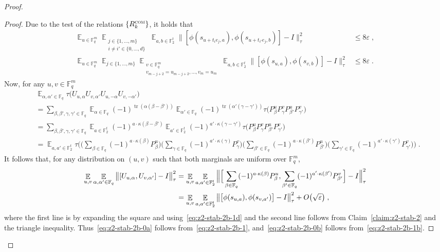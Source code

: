 \documentclass[11pt]{article}
\theoremstyle{definition}
\newcommand{\Id}{\ensuremath{I}}
\DeclareMathOperator*{\Expectation}{\mathbb{E}}
\newcommand{\Es}[1]{\Expectation_{#1}}
\newcommand{\F}{\ensuremath{\mathbb{F}}}
\newcommand{\com}{\textsc{com}}
\newcommand{\eps}{\varepsilon}
\DeclareMathOperator{\tr}{tr}
\begin{document}
\begin{proof}
\begin{proof}
Due to the test of the relations $\{R^\com_k\}$, it holds that 
\begin{align}
\Es{u\in \F_q^m} \Es{\substack{j\in\{1,\ldots,m\} \\ i\neq i' \in \{0,\ldots,d\}}} \Es{a,b\in \F_2^t} \big\| [\phi(s_{u+t_i e_j,a}),\phi(s_{u+t_{i'} e_j,b})] - \Id \big\|_\tau^2&\leq 8\eps\; ,\label{eq:z2-stab-2b-1}\\
\Es{u\in \F_q^m} \Es{j\in\{1,\ldots,m\}} \Es{\substack{v\in \F_q^m \\v_{m-j+2}=u_{m-j+2},\ldots,v_m=u_m}}\Es{a,b\in \F_2^t} \big\| [\phi(s_{u,a}),\phi(s_{v,b})]-\Id\big\|_\tau^2&\leq 8\eps\;.\label{eq:z2-stab-2b-1b}
\end{align}
Now, for any $u,v\in \F_q^m$
\begin{align*}
 &\Es{\alpha,\alpha'\in \F_q}\tau\big( U_{u,\alpha} U_{v,\alpha'} U_{u,-\alpha} U_{v,-\alpha'} \big) \\
&= \sum_{\beta,\beta',\gamma,\gamma'\in \F_q}\Es{\alpha\in \F_q} (-1)^{\tr(\alpha(\beta-\beta'))} \Es{\alpha'\in \F_q} (-1)^{\tr(\alpha'(\gamma-\gamma'))}  \tau(P^{u}_\beta P^{v}_\gamma P^{u}_{\beta'} P^{v}_{\gamma'}\big)\\
&=\sum_{\beta,\beta',\gamma,\gamma'\in \F_q}\Es{a\in\F_2^t} (-1)^{a\cdot\kappa(\beta-\beta')} \Es{a'\in\F_2^t} (-1)^{a'\cdot\kappa(\gamma-\gamma')} \tau(P^{u}_\beta P^{v}_\gamma P^{u}_{\beta'} P^{v}_{\gamma'}\big)\\
&=\Es{a,a'\in\F_2^t}  \tau\Big( \Big(\sum_{\beta\in \F_q} (-1)^{a\cdot \kappa(\beta)} P^{u}_\beta\Big) \Big(\sum_{\gamma\in \F_q} (-1)^{a'\cdot \kappa(\gamma)} P^{v}_\gamma\Big)\Big(\sum_{\beta'\in \F_q} (-1)^{a\cdot \kappa(\beta')} P^{u}_{\beta'}\Big)\Big(\sum_{\gamma'\in \F_q} (-1)^{a'\cdot \kappa(\gamma')} P^{v}_{\gamma'}\Big)\Big)\;.
\end{align*}
It follows that, for any distribution on $(u,v)$ such that both marginals are uniform over $\F_q^m$,
\begin{align}
\Es{u,v} \Es{\alpha,\alpha'\in \F_q} \big\| [U_{u,\alpha} ,U_{v,\alpha'} ]-\Id\big\|_\tau^2
&= \Es{u,v}\Es{a,a'\in \F_2^t} \Big\| \Big[\sum_{\beta\in \F_q} (-1)^{a\cdot \kappa(\beta)} P^{u}_\beta ,\sum_{\beta'\in \F_q} (-1)^{a'\cdot \kappa(\beta')} P^{v}_{\beta'} \Big]-\Id\Big\|_\tau^2\notag\\
&= \Es{u,v}\Es{a,a'\in \F_2^t} \big\| \big[ \phi(s_{u,a}),\phi(s_{v,a'})\big]-\Id\big\|_\tau^2+O\big(\sqrt{\eps}\big)\;,\label{eq:z2-stab-2b-1d}
\end{align}
where the first line is by expanding the square and using~\eqref{eq:z2-stab-2b-1d} and the second line follows from Claim~\ref{claim:z2-stab-2} and the triangle inequality. Thus~\eqref{eq:z2-stab-2b-0a} follows from~\eqref{eq:z2-stab-2b-1}, and~\eqref{eq:z2-stab-2b-0b} follows from~\eqref{eq:z2-stab-2b-1b}.
\end{proof}


\end{proof}
\end{document}
